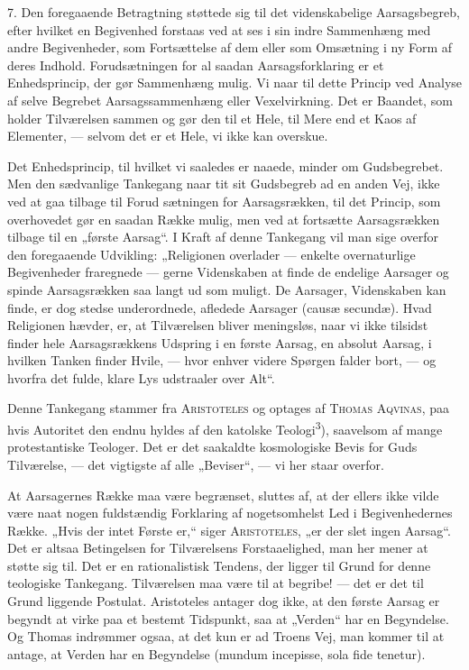 \documentclass[12pt,a4paper,openany]{book}
\newcommand{\opage}[1]{\marginnote{\footnotesize\textit{[#1]}}}
\begin{document}
7. Den foregaaende Betragtning støttede sig til det videnskabelige
Aarsagsbegreb, efter hvilket en Begivenhed forstaas ved at ses i sin
indre Sammenhæng med andre Begivenheder, som Fortsættelse af dem eller
som Omsætning i ny Form af deres Indhold. Forudsætningen for al saadan
Aarsagsforklaring er et Enhedsprincip, der gør Sammenhæng mulig. Vi naar
til dette Princip ved Analyse af selve Begrebet Aarsagssammenhæng eller
Vexelvirkning. Det er Baandet, som holder Tilværelsen sammen og gør den
til et Hele, til Mere end et Kaos af Elementer, --- selvom det er et
Hele, vi ikke kan overskue.

Det Enhedsprincip, til hvilket vi saaledes er naaede, minder om
Gudsbegrebet. Men den sædvanlige Tankegang naar tit sit Gudsbegreb ad en
anden Vej, ikke ved at gaa tilbage til Forud%
\opage{22}sætningen for Aarsagsrækken, til det Princip, som overhovedet
gør en saadan Række mulig, men ved at fortsætte Aarsagsrækken tilbage
til en „første Aarsag“. I Kraft af denne Tankegang vil man sige overfor
den foregaaende Udvikling: „Religionen overlader --- enkelte
overnaturlige Begivenheder fraregnede --- gerne Videnskaben at finde de
endelige Aarsager og spinde Aarsagsrækken saa langt ud som muligt. De
Aarsager, Videnskaben kan finde, er dog stedse underordnede, afledede
Aarsager (causæ secundæ). Hvad Religionen hævder, er, at Tilværelsen
bliver meningsløs, naar vi ikke tilsidst finder hele Aarsagsrækkens
Udspring i en første Aarsag, en absolut Aarsag, i hvilken Tanken finder
Hvile, --- hvor enhver videre Spørgen falder bort, --- og hvorfra det
fulde, klare Lys udstraaler over Alt“.

Denne Tankegang stammer fra \textsc{Aristoteles} og optages af
\textsc{Thomas Aqvinas}, paa hvis Autoritet den endnu hyldes af den
katolske Teologi\textsuperscript{3}), saavelsom af mange protestantiske
Teologer. Det er det saakaldte kosmologiske Bevis for Guds Tilværelse,
--- det vigtigste af alle „Beviser“, --- vi her staar overfor.

At Aarsagernes Række maa være begrænset, sluttes af, at der ellers ikke
vilde være naat nogen fuldstændig Forklaring af nogetsomhelst Led i
Begivenhedernes Række. „Hvis der intet Første er,“ siger
\textsc{Aristoteles}, „er der slet ingen Aarsag“. Det er altsaa
Betingelsen for Tilværelsens Forstaaelighed, man her mener at støtte sig
til. Det er en rationalistisk Tendens, der ligger til Grund for denne
teologiske Tankegang. Tilværelsen maa være til at begribe! --- det er
det til Grund liggende Postulat. Aristoteles antager dog ikke, at den
første Aarsag er begyndt at virke paa et bestemt Tidspunkt, saa at
„Verden“ har en Begyndelse. Og Thomas indrømmer ogsaa, at det kun er ad
Troens Vej, man kommer til at antage, at Verden har en Begyndelse
(mundum incepisse, sola fide tenetur).
\end{document}

